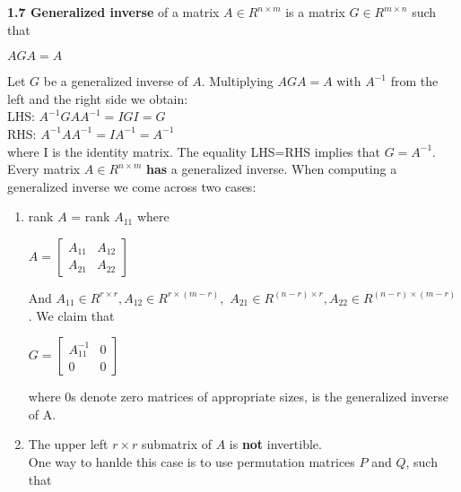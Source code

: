 \documentclass{article}
\begin{document}
\begin{multicols}{2}
\textbf{1.7 Generalized inverse} of a matrix
$A \in R^{n \times m}$ is a matrix $G \in R^{m \times n}$ such that
\begin{center}
    $AGA = A$
\end{center}
Let $G$ be a generalized inverse of $A$. Multiplying $AGA=A$ with $A^{-1}$ from the
left and the right side we obtain:\\
LHS: $A^{-1}GAA^{-1} = IGI = G$\\
RHS: $A^{-1}AA^{-1} = IA^{-1} = A^{-1}$\\
where I is the identity matrix. The equality LHS=RHS implies that $G=A^{-1}$.\\
Every matrix $A \in R^{n \times m}$ \textbf{has} a generalized inverse. When computing
a generalized inverse we come across two cases:
\begin{enumerate}
    \item rank $A$ = rank $A_{11}$ where
        \begin{center}
            \begin{math}
                A=
                \begin{bmatrix}
                    A_{11} & A_{12} \\
                    A_{21} & A_{22}
                \end{bmatrix}
            \end{math}
        \end{center}
        And $A_{11} \in R^{r \times r}, A_{12} \in R^{r \times (m-r)},$
        $ A_{21} \in R^{(n-r) \times r}, A_{22} \in R^{(n-r)\times (m-r)}$.
        We claim that
        \begin{center}
            \begin{math}
                G=
                \begin{bmatrix}
                    A_{11}^{-1} & 0 \\
                    0           & 0
                \end{bmatrix}
            \end{math}
        \end{center}
        where 0s denote zero matrices of appropriate sizes, is the generalized inverse of A.
    \item The upper left $r \times r$ submatrix of $A$ is \textbf{not} invertible.\\
        One way to hanlde this case is to use permutation matrices $P$ and $Q$, such that
        \begin{center}
            \begin{math}

\end{math}
\end{center}
\end{enumerate}
\end{multicols}
\end{document}
